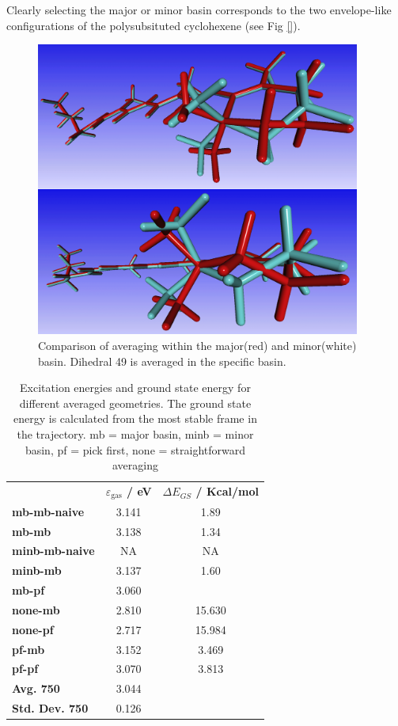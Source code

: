 \documentclass[twoside, 12pt]{article}
\begin{document}
Clearly selecting the major or minor basin corresponds to the two envelope-like configurations of the polysubsituted cyclohexene (see Fig \ref{}).

\begin{figure}[H]
\centering
\includegraphics[width=0.95\textwidth]{./figures/mb_minb_comp.png}
\caption{Comparison of averaging within the major(red) and minor(white) basin. Dihedral 49 is averaged in the specific basin.} 
\label{fig:dih49dih52}
\end{figure}

\begin{table}[h]
\footnotesize
\centering
\caption{Excitation energies and ground state energy for different averaged geometries. The ground state energy is calculated from the most stable frame in the trajectory. mb = major basin, minb = minor basin, pf = pick first, none = straightforward averaging}
\label{tab:ex_ret_avrg}
\begin{tabular}{lcc}
& \textbf{$\varepsilon_\mathrm{gas}$ / eV} & \textbf{$\Delta E_{GS}$ / Kcal/mol}  \\ 
\textbf{mb-mb-naive} & 3.141 & 1.89\\ 
\textbf{mb-mb} & 3.138 & 1.34\\
\textbf{minb-mb-naive} & NA & NA \\
\textbf{minb-mb} & 3.137 & 1.60\\
\textbf{mb-pf} & 3.060 & \\ 
\textbf{none-mb} & 2.810 & 15.630\\ 
\textbf{none-pf} & 2.717 & 15.984\\ 
\textbf{pf-mb} &  3.152 & 3.469\\ 
\textbf{pf-pf} & 3.070 & 3.813\\ 
\textbf{Avg. 750} &  3.044 \\ 
\textbf{Std. Dev. 750} &  0.126\\ 
\end{tabular}
\end{table}
\end{document}
